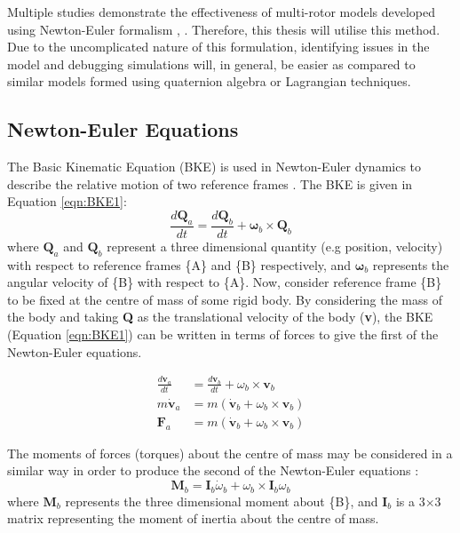 Multiple studies demonstrate the effectiveness of multi-rotor models developed using Newton-Euler formalism \cite{Bouabdallah2006}, \cite{Baranek2012}. Therefore, this thesis will utilise this method. Due to the uncomplicated nature of this formulation, identifying issues in the model and debugging simulations will, in general, be easier as compared to similar models formed using quaternion algebra or Lagrangian techniques.



\subsection{Newton-Euler Equations}
The Basic Kinematic Equation (BKE) is used in Newton-Euler dynamics to describe the relative motion of two reference frames \cite{Ardema2006}. The BKE is given in Equation \ref{eqn:BKE1}:
\begin{equation}\label{eqn:BKE1} 
\frac{d\textbf{Q}_{a}}{dt}=\frac{d\textbf{Q}_{b}}{dt}+\mathbf{\omega}_{b} \times \textbf{Q}_{b}
\end{equation}
where $\textbf{Q}_{a}$ and $\textbf{Q}_{b}$ represent a three dimensional quantity (e.g position, velocity) with respect to reference frames \{A\} and \{B\} respectively, and $\mathbf\omega_{b}$ represents the angular velocity of \{B\} with respect to \{A\}. Now, consider reference frame \{B\} to be fixed at the centre of mass of some rigid body. By considering the mass of the body and taking \textbf{Q} as the translational velocity of the body (\textbf{v}), the BKE (Equation \ref{eqn:BKE1}) can be written in terms of forces to give the first of the Newton-Euler equations.

\begin{equation*}
\begin{split} 
\frac{d\textbf{v}_{a}}{dt}&=\frac{d\textbf{v}_{b}}{dt}+\omega_{b} \times \textbf{v}_{b}\\
m\dot{\textbf{v}}_{a}&=m(\dot{\textbf{v}}_{b}+\omega_{b} \times \textbf{v}_{b})\\
\textbf{F}_{a}&=m(\dot{\textbf{v}}_{b}+\omega_{b}\times\textbf{v}_{b})
\end{split}
\end{equation*}

The moments of forces (torques) about the centre of mass may be considered in a similar way in order to produce the second of the Newton-Euler equations \cite{Ardema2006}:
\begin{equation*}
\textbf{M}_{b}=\textbf{I}_{b}\dot{\omega}_{b}+\omega_{b}\times\textbf{I}_{b}\omega_{b}
\end{equation*}
where $\textbf{M}_{b}$ represents the three dimensional moment about \{B\}, and $\textbf{I}_{b}$ is a 3$\times$3 matrix representing the moment of inertia about the centre of mass.

